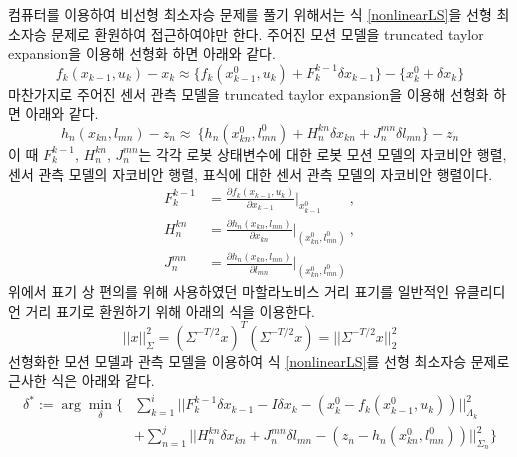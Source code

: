 \documentclass[master,korean,final]{cbnu-ecs}
\begin{document}
컴퓨터를 이용하여 비선형 최소자승 문제를 풀기 위해서는 식 \eqref{nonlinearLS}을 선형 최소자승 문제로 환원하여 접근하여야만 한다. 
주어진 모션 모델을 truncated taylor expansion을 이용해 선형화 하면 아래와 같다.
\begin{equation}
\label{motion_model_linear}
f_k(x_{k-1}, u_k)-x_k\approx \{ f_k(x^0_{k-1}, u_k) +F_k^{k-1}\delta x_{k-1} \}-\{ x_k^0 + \delta x_k \}
\end{equation}
마찬가지로 주어진 센서 관측 모델을 truncated taylor expansion을 이용해 선형화 하면 아래와 같다.
\begin{equation}
\label{measurement_model_linear}
h_n(x_{kn}, l_{mn})-z_n\approx \ \{ h_n(x^0_{kn}, l^0_{mn}) + H^{kn}_n \delta x_{kn} + J_n^{mn}\delta l_{mn} \}-z_n
\end{equation}
이 때 $F_k^{k-1}$, $H_n^{kn}$, $J_n^{mn}$는 각각 로봇 상태변수에 대한 로봇 모션 모델의 자코비안 행렬, 센서 관측 모델의 자코비안 행렬, 표식에 대한 센서 관측 모델의 자코비안 행렬이다.
\begin{equation}
\label{model_jacobian}
\begin{split}
F_k^{k-1}&=\frac{\partial f_k(x_{k-1}, u_k)}{\partial x_{k-1}} \bigg|_{x^0_{k-1}}\qquad,\\
H_n^{kn}&=\frac{\partial h_n(x_{kn}, l_{mn})}{\partial x_{kn}} \bigg|_{(x^0_{kn},l^0_{mn})}\ ,\\
J_n^{mn}&=\frac{\partial h_n(x_{kn}, l_{mn})}{\partial l_{mn}} \bigg|_{(x^0_{kn},l^0_{mn})}
\end{split}
\end{equation}
위에서 표기 상 편의를 위해 사용하였던 마할라노비스 거리 표기를 일반적인 유클리디언 거리 표기로 환원하기 위해 아래의 식을 이용한다.
\begin{equation}
\label{mahalanobis_to_euclidean}
|| x ||^2_\Sigma = (\Sigma^{-T/2}x)^T(\Sigma^{-T/2}x) = || \Sigma^{-T/2}x ||^2_2
\end{equation}
선형화한 모션 모델과 관측 모델을 이용하여 식 \eqref{nonlinearLS}를 선형 최소자승 문제로 근사한 식은 아래와 같다.
\begin{equation}
\label{linearizedLS}
\begin{split}
\delta^*:=\arg\min_\delta \bigg\{& \sum_{k=1}^i || F_k^{k-1}\delta x_{k-1} - I\delta x_k - (x_k^0 - f_k(x^0_{k-1}, u_k) )  ||^2_{\Lambda_k} \\
&+ \sum_{n=1}^j || H^{kn}_n \delta x_{kn} + J_n^{mn}\delta l_{mn} - (z_n - h_n(x^0_{kn}, l^0_{mn})) ||^2_{\Sigma_n}\bigg\}
\end{split}
\end{equation}
\end{document}
